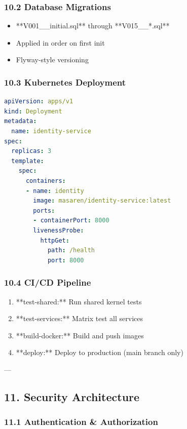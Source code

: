 \documentclass[11pt,a4paper]{article}
\begin{document}
\subsubsection{10.2 Database Migrations}


\begin{itemize}
\item **V001__initial.sql** through **V015__*.sql**
\item Applied in order on first init
\item Flyway-style versioning
\end{itemize}

\subsubsection{10.3 Kubernetes Deployment}


\begin{lstlisting}[language=yaml, caption=yaml code]
apiVersion: apps/v1
kind: Deployment
metadata:
  name: identity-service
spec:
  replicas: 3
  template:
    spec:
      containers:
      - name: identity
        image: masaren/identity-service:latest
        ports:
        - containerPort: 8000
        livenessProbe:
          httpGet:
            path: /health
            port: 8000
\end{lstlisting}

\subsubsection{10.4 CI/CD Pipeline}


\begin{enumerate}
\item **test-shared:** Run shared kernel tests
\item **test-services:** Matrix test all services
\item **build-docker:** Build and push images
\item **deploy:** Deploy to production (main branch only)
\end{enumerate}

---

\subsection{11. Security Architecture}

\subsubsection{11.1 Authentication & Authorization}
\end{document}
